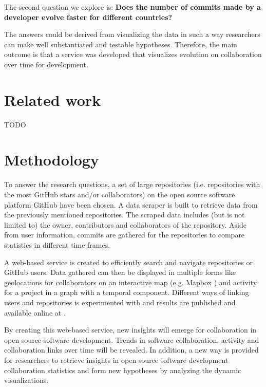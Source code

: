 \documentclass[acmtog, authorversion]{acmart}
\begin{document}
The second question we explore is: \textbf{Does the number of commits made by a developer evolve faster for different countries?}

The answers could be derived from visualizing the data in such a way researchers can make well substantiated and testable hypotheses.
Therefore, the main outcome is that a service was developed that visualizes evolution on collaboration over time for development.

\section{Related work}
TODO
\cite{Jermakovics2013}
\cite{GHOctoverse}
\cite{StackOverflow2017}

\section{Methodology}
To answer the research questions,  a set of large repositories (i.e. repositories with the most GitHub stars and/or collaborators) on the open source software platform GitHub have been chosen.
A data scraper is built to retrieve data from the previously mentioned repositories.
The scraped data includes (but is not limited to) the owner, contributors and collaborators of the repository.
Aside from user information, commits are gathered for the repositories to compare statistics in different time frames.

A web-based service is created to efficiently search and navigate repositories or GitHub users.
Data gathered can then be displayed in multiple forms like geolocations for collaborators on an interactive map (e.g. Mapbox \cite{MapBox}) and activity for a project in a graph with a temporal component.
Different ways of linking users and repositories is experimented with and results are published and available online at \cite{githubvisualizerovertime}.

By creating this web-based service, new insights will emerge for collaboration in open source software development.
Trends in software collaboration, activity and collaboration links over time will be revealed.
In addition, a new way is provided for researchers to retrieve insights in open source software development collaboration statistics and form new hypotheses by analyzing the dynamic visualizations.
\end{document}
